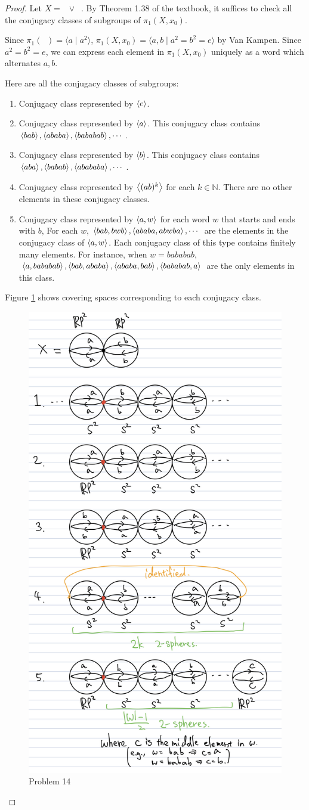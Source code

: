 \documentclass[12pt, psamsfonts]{amsart}
\theoremstyle{definition}
\theoremstyle{remark}
\DeclareMathOperator{\RP}{\mathbb{R}\mathbf{P}^2}
\numberwithin{equation}{section}
\begin{document}
\begin{proof}
  Let $X = \RP \vee \RP$.
  By Theorem 1.38 of the textbook, it suffices to check all the conjugacy classes of subgroups of $\pi_1(X, x_0)$.

  Since $\pi_1(\RP) = \langle a \mid a^2 \rangle$, $\pi_1(X, x_0) = \langle a, b \mid a^2 = b^2 = e \rangle$ by Van Kampen.
  Since $a^2 = b^2 = e$, we can express each element in $\pi_1(X, x_0)$ uniquely as a word which alternates $a, b$.

  Here are all the conjugacy classes of subgroups:
  \begin{enumerate}
    \item
      Conjugacy class represented by $\ev{e}$.
    \item
      Conjugacy class represented by $\ev{a}$.
      This conjugacy class contains $\ev{bab}, \ev{ababa}, \ev{bababab}, \cdots$.
    \item
      Conjugacy class represented by $\ev{b}$.
      This conjugacy class contains $\ev{aba}, \ev{babab}, \ev{abababa}, \cdots$.
    \item
      Conjugacy class represented by $\ev{(ab)^k}$ for each $k \in \mathbb{N}$.
      There are no other elements in these conjugacy classes.
    \item
      Conjugacy class represented by $\ev{a, w}$ for each word $w$ that starts and ends with $b$,
      For each $w$, $\ev{bab, bwb}, \ev{ababa, abwba}, \cdots$ are the elements in the conjugacy class of $\ev{a, w}$.
      Each conjugacy class of this type contains finitely many elements.
      For instance, when $w = bababab$, $\ev{a, bababab}, \ev{bab, ababa}, \ev{ababa, bab}, \ev{bababab, a}$ are the only elements in this class.
  \end{enumerate}

  Figure \ref{fig:problem14} shows covering spaces corresponding to each conjugacy class.
  \begin{figure}
    \includegraphics[width=.5\linewidth]{problem14_rp2.jpeg}
    \caption{Problem 14}
    \label{fig:problem14}
  \end{figure}


\end{proof}
\end{document}
